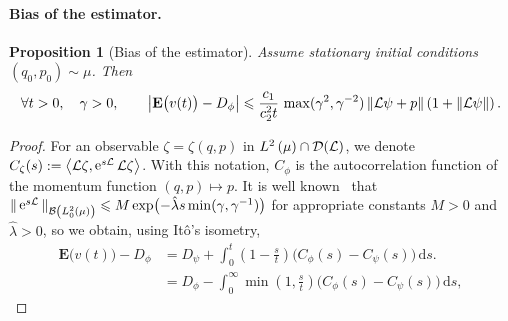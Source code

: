 \documentclass[11pt,a4paper]{article}
\DeclareMathOperator{\e}{e}
\newcommand{\expect}[0]{\mathbf{E}}
\renewcommand{\d}{\mathrm d}
\theoremstyle{plain}
\newtheorem{proposition}{Proposition}[section]
\numberwithin{equation}{section}
\renewcommand{\leq}{\leqslant}
\begin{document}
\paragraph{Bias of the estimator.}%

\begin{proposition}
    [Bias of the estimator]
    Assume stationary initial conditions $(q_0, p_0) \sim \mu$.
    Then
    \begin{align*}
        \forall t > 0, \quad \gamma > 0, \qquad
        \abs{\expect \bigl( v(t) \bigr) - D_{\phi}}
        \leq \frac{c_1}{c_2^2 t} \, \max(\gamma^2, \gamma^{-2}) \norm{\mathcal L\psi + p}  \left(1 + \norm{\mathcal L \psi} \right).
    \end{align*}
\end{proposition}
\begin{proof}
    For an observable $\zeta = \zeta(q, p)$ in $\lp{2}{\mu} \cap \mathcal D(\mathcal L)$,
    we denote $C_{\zeta}(s) := \ip{\mathcal L \zeta}{\e^{s \mathcal L} \mathcal L \zeta}$.
    With this notation, $C_{\phi}$ is the autocorrelation function of the momentum function $(q, p) \mapsto p$.
    It is well known~\cite{roussel2018spectral} that $\norm*{ \e^{s \mathcal L} }[\mathcal B \left(L^2_0\left(\mu\right) \right)] \leq M \exp \bigl(- \hat \lambda s \min(\gamma, \gamma^{-1}) \bigr)$
    for appropriate constants $M > 0$ and $\hat \lambda > 0$,
    so we obtain, using It\^o's isometry,
    \begin{align*}
        \expect \bigl(v(t)\bigr) - D_{\phi}
        &= D_{\psi} + \int_{0}^{t} \left(1 - \frac{s}{t}\right) \bigl( C_{\phi}(s) - C_{\psi}(s) \bigr) \, \d s. \\
        &= D_{\phi} - \int_{0}^{\infty} \min\left(1, \frac{s}{t}\right) \bigl( C_{\phi}(s) - C_{\psi}(s) \bigr) \, \d s,
    \end{align*}


\end{proof}
\end{document}
